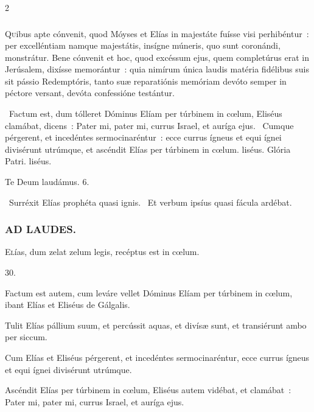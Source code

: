 \documentclass[9pt,twoside]{extarticle}
\begin{document}
\begin{multicols}{2}
{{\subsubsection*{\center {}}
\lettrine{Q}uibus apte cónvenit, quod Móyses et Elías in majestáte fuísse visi perhibéntur~: per excelléntiam namque majestátis, insígne múneris, quo sunt coronándi, monstrátur. Bene cónvenit et hoc, quod excéssum ejus, quem completúrus erat in Jerúsalem, dixísse memorántur~: quia nimírum única laudis matéria fidélibus suis sit pássio Redemptóris, tanto suæ reparatiónis memóriam devóto semper in péctore versant, devóta confessióne testántur.

\begin{tightlist}{}
\item {}~Factum est, dum tólleret Dóminus Elíam per túrbinem in cœlum, \textred{*} Eliséus clamábat, dicens~: Pater mi, pater mi, currus Israel, et auríga ejus. ~Cumque pérgerent, et incedéntes sermocinaréntur~: ecce currus ígneus et equi ígnei divisérunt utrúmque, et ascéndit Elías per túrbinem in cœlum. liséus. Glória Patri. liséus.
\item Te Deum laudámus. 6.
\item {}~Surréxit Elías prophéta quasi ignis. ~Et verbum ipsíus quasi fácula ardébat.
\end{tightlist}

\subsubsection*{\center \textsc{AD LAUDES.}}
\begin{center}\end{center}
\lettrine{E}lías, dum zelat zelum legis, recéptus est in cœlum.

\begin{tightlist}
\item {} 30.
\item {} Factum est autem, cum leváre vellet Dóminus Elíam per túrbinem in cœlum, ibant Elías et Eliséus de Gálgalis.
\item {} Tulit Elías pállium suum, et percússit aquas, et divísæ sunt, et transiérunt ambo per siccum.
\item {} Cum Elías et Eliséus pérgerent, et incedéntes sermocinaréntur, ecce currus ígneus et equi ígnei divisérunt utrúmque.
\item {} Ascéndit Elías per túrbinem in cœlum, Eliséus autem vidébat, et clamábat~: Pater mi, pater mi, currus Israel, et auríga ejus.
\end{tightlist}

}}
\end{multicols}
\end{document}

